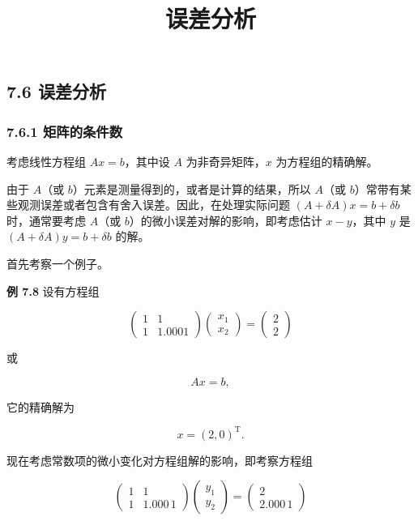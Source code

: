 \documentclass[
  10pt,
  fontset=fandol]{ctexart}
\title{误差分析}
\author{}
\date{}
\begin{document}
\maketitle

\subsection{7.6 误差分析}\label{ux8befux5deeux5206ux6790}

\subsubsection{7.6.1 矩阵的条件数}\label{ux77e9ux9635ux7684ux6761ux4ef6ux6570}

考虑线性方程组 \(Ax=b\)，其中设 \(A\) 为非奇异矩阵，\(x\) 为方程组的精确解。

由于 \(A\)（或 \(b\)）元素是测量得到的，或者是计算的结果，所以 \(A\)（或 \(b\)）常带有某些观测误差或者包含有舍入误差。因此，在处理实际问题 \((A+\delta A)x=b+\delta b\) 时，通常要考虑 \(A\)（或 \(b\)）的微小误差对解的影响，即考虑估计 \(x-y\)，其中 \(y\) 是 \((A+\delta A)y=b+\delta b\) 的解。

首先考察一个例子。

\textbf{例 7.8} 设有方程组

\[
\begin{pmatrix}1&1\\1&1.0001\end{pmatrix}
\begin{pmatrix}x_1\\x_2\end{pmatrix}
=\begin{pmatrix}2\\2\end{pmatrix}
\]

或

\[
Ax=b,
\tag{7.6.1}
\]

它的精确解为

\[
x=(2,0)^{\mathrm T}.
\]

现在考虑常数项的微小变化对方程组解的影响，即考察方程组

\[
\begin{pmatrix}1&1\\1&1.000\,1\end{pmatrix}
\begin{pmatrix}y_1\\y_2\end{pmatrix}
=\begin{pmatrix}2\\2.000\,1\end{pmatrix}
\]
\end{document}
